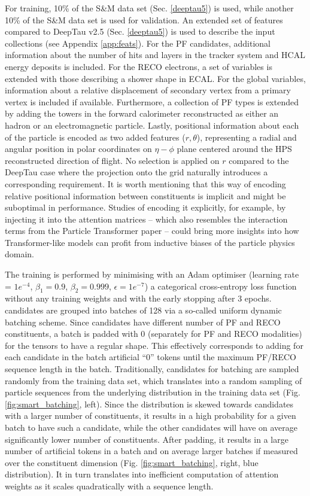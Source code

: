 For training, 10\% of the S\&M data set (Sec. \ref{deeptau5}) is used, while another 10\% of the S\&M data set is used for validation. An extended set of features compared to DeepTau v2.5 (Sec. \ref{deeptau5}) is used to describe the input collections (see Appendix \ref{app:feats}). For the PF candidates, additional information about the number of hits and layers in the tracker system and HCAL energy deposits is included. For the RECO electrons, a set of variables is extended with those describing a shower shape in ECAL. For the global variables, information about a relative displacement of secondary vertex from a primary vertex is included if available.  Furthermore, a collection of PF types is extended by adding the towers in the forward calorimeter reconstructed as either an hadron or an electromagnetic particle. Lastly, positional information about each of the particle is encoded as two added features ($r, \theta$), representing a radial and angular position in polar coordinates on $\eta-\phi$ plane centered around the HPS reconstructed \tauh direction of flight. No selection is applied on $r$ compared to the DeepTau case where the projection onto the grid naturally introduces a corresponding requirement. It is worth mentioning that this way of encoding relative positional information between constituents is implicit and might be suboptimal in performance. Studies of encoding it explicitly, for example, by injecting it into the attention matrices \cite{chen2021demystifying}  -- which also resembles the interaction terms from the Particle Transformer paper -- could bring more insights into how Transformer-like models can profit from inductive biases of the particle physics domain.

The training is performed by minimising with an Adam optimiser (learning rate = $1e^{-4}$, $\beta_1=0.9$, $\beta_2=0.999$, $\epsilon=1e^{-7}$) a categorical cross-entropy loss function without any training weights and with the early stopping after 3 epochs. \tauh candidates are grouped into batches of 128 via a so-called uniform dynamic batching scheme. Since \tauh candidates have different number of PF and RECO constituents, a batch is padded with 0 (separately for PF and RECO modalities) for the tensors to have a regular shape. This effectively corresponds to adding for each \tauh candidate in the batch artificial \enquote{0} tokens until the maximum PF/RECO sequence length in the batch. Traditionally, \tauh candidates for batching are sampled randomly from the training data set, which translates into a random sampling of particle sequences from the underlying distribution in the training data set (Fig. \ref{fig:smart_batching}, left). Since the distribution is skewed towards \tauh candidates with a larger number of constituents, it results in a high probability for a given batch to have such a \tauh candidate, while the other \tauh candidates will have on average significantly lower number of constituents. After padding, it results in a large number of artificial tokens in a batch and on average larger batches if measured over the constituent dimension (Fig. \ref{fig:smart_batching}, right, blue distribution). It in turn translates into inefficient computation of attention weights as it scales quadratically with a sequence length. 

